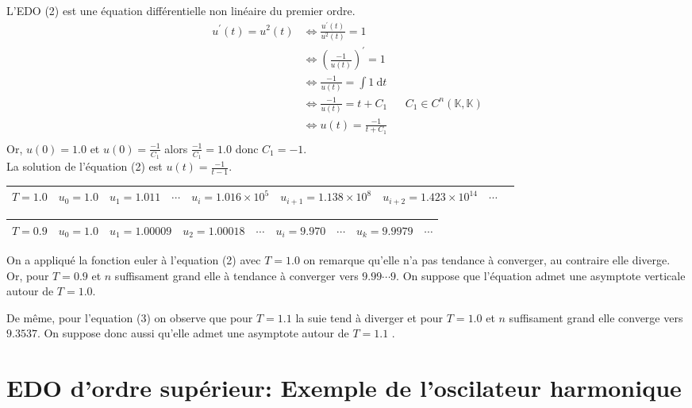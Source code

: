 \documentclass{article}
\begin{document}
L'EDO (2) est une équation différentielle non linéaire du premier ordre.
\begin{align*}
u^{'}(t)=u^{2}(t) &\iff \frac{u^{'}(t)}{u^{2}(t)}=1 \\
				  &\iff \left(\frac{-1}{u(t)}\right)^{'}=1 \\
				  &\iff \frac{-1}{u(t)}=\int 1 ~ \mathrm{d}t \\
				  &\iff \frac{-1}{u(t)}=t+C_1 && C_1\in C^{n}(\mathbb{K},\mathbb{K}) \\
				  &\iff u(t)=\frac{-1}{t+C_1} \\
\end{align*}
Or, $u(0)=1.0$ et $u(0)=\frac{-1}{C_1}$ alors $\frac{-1}{C_1}=1.0$ donc $C_1= -1$. \\
La solution de l'équation (2) est $ u(t)=\frac{-1}{t-1}$.\\

\begin{center}
\begin{tabular}{|c|c|c|c|c|c|c|c|c|}
\hline
$T=1.0$&$u_0=1.0$ & $u_1=1.011$ & $\cdots$& $ u_{i}=1.016 \times 10^{5}$ & $u_{i+1}=1.138 \times 10^{8}$ & $ u_{i+2}=1.423 \times 10^{14}$ & $\cdots$ \\
\hline
\end{tabular}
\begin{tabular}{|c|c|c|c|c|c|c|c|c|}
\hline
$T=0.9$&$u_0=1.0$ & $u_1=1.00009$ & $ u_{2}=1.00018 $& $\cdots$ & $ u_{i}=9.970$ & $\cdots$ & $u_{k}=9.9979 $ & $\cdots$ \\
\hline 
\end{tabular}
\end{center}

On a appliqué la fonction euler à l'equation (2) avec $T=1.0 $ on remarque qu'elle n'a pas tendance à converger, au contraire elle diverge. Or, pour $T=0.9$ et $n$ suffisament grand elle à tendance à converger vers $9.99 \cdots 9 $. On suppose que l'équation admet une asymptote verticale autour de $T=1.0$.

De même, pour l'equation (3) on observe que pour $T=1.1$ la suie tend à diverger et pour $T=1.0$ et $n$ suffisament grand elle converge vers $9.3537 $. On suppose donc aussi qu'elle admet une asymptote autour de $T = 1.1$ .\\




\section{EDO d'ordre supérieur: Exemple de l'oscilateur harmonique}
\end{document}
